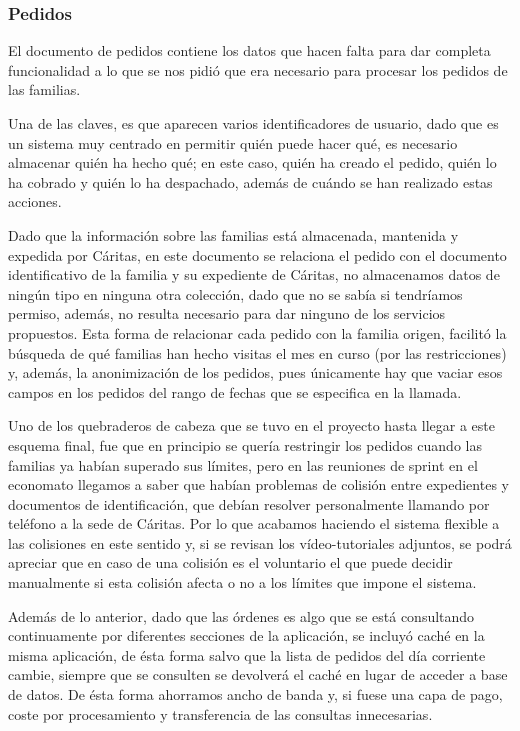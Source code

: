 \subsubsection{Pedidos}
El documento de pedidos contiene los datos que hacen falta para dar completa funcionalidad a lo que se nos pidió que era necesario para procesar los pedidos de las familias.
\vspace{1em}
\par Una de las claves, es que aparecen varios identificadores de usuario, dado que es un sistema muy centrado en permitir quién puede hacer qué, es necesario almacenar quién ha hecho qué; en este caso, quién ha creado el pedido, quién lo ha cobrado y quién lo ha despachado, además de cuándo se han realizado estas acciones.
\vspace{1em}
\par Dado que la información sobre las familias está almacenada, mantenida y expedida por Cáritas, en este documento se relaciona el pedido con el documento identificativo de la familia y su expediente de Cáritas, no almacenamos datos de ningún tipo en ninguna otra colección, dado que no se sabía si tendríamos permiso, además, no resulta necesario para dar ninguno de los servicios propuestos. Esta forma de relacionar cada pedido con la familia origen, facilitó la búsqueda de qué familias han hecho visitas el mes en curso (por las restricciones) y, además, la anonimización de los pedidos, pues únicamente hay que vaciar esos campos en los pedidos del rango de fechas que se especifica en la llamada.
\vspace{1em}
\par Uno de los quebraderos de cabeza que se tuvo en el proyecto hasta llegar a este esquema final, fue que en principio se quería restringir los pedidos cuando las familias ya habían superado sus límites, pero en las reuniones de sprint en el economato llegamos a saber que habían problemas de colisión entre expedientes y documentos de identificación, que debían resolver personalmente llamando por teléfono a la sede de Cáritas. Por lo que acabamos haciendo el sistema flexible a las colisiones en este sentido y, si se revisan los vídeo-tutoriales adjuntos, se podrá apreciar que en caso de una colisión es el voluntario el que puede decidir manualmente si esta colisión afecta o no a los límites que impone el sistema.
\vspace{1em}
\par Además de lo anterior, dado que las órdenes es algo que se está consultando continuamente por diferentes secciones de la aplicación, se incluyó caché en la misma aplicación, de ésta forma salvo que la lista de pedidos del día corriente cambie, siempre que se consulten se devolverá el caché en lugar de acceder a base de datos. De ésta forma ahorramos ancho de banda y, si fuese una capa de pago, coste por procesamiento y transferencia de las consultas innecesarias.
